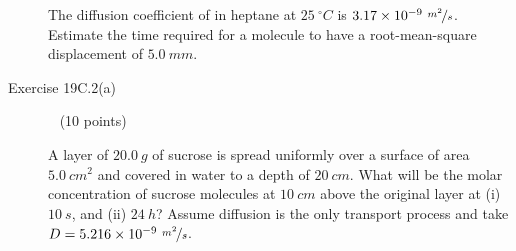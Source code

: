 \documentclass[12pt, openany, letterpaper]{memoir}
\begin{document}
\begin{description}
	The diffusion coefficient of  in heptane at $25~^\circ C$ is $3.17\times10^{-9}~\nicefrac{m^2}{s}$. Estimate the time required for a  molecule to have a root-mean-square displacement of $5.0~mm$.	
	
	\vspace{23em}	
	\item [Exercise 19C.2(a)] ~ (10 points)	

	A layer of $20.0~g$ of sucrose is spread uniformly over a surface of area $5.0~cm^2$ and covered in water to a depth of $20~cm$. What will be the molar concentration of sucrose molecules at $10~cm$ above the original layer at (i) $10~s$, and (ii) $24~h$? Assume diffusion is the only transport process and take $D=5.216\times10^{-9}~\nicefrac{m^2}{s}$.
	


\end{description}
\end{document}
